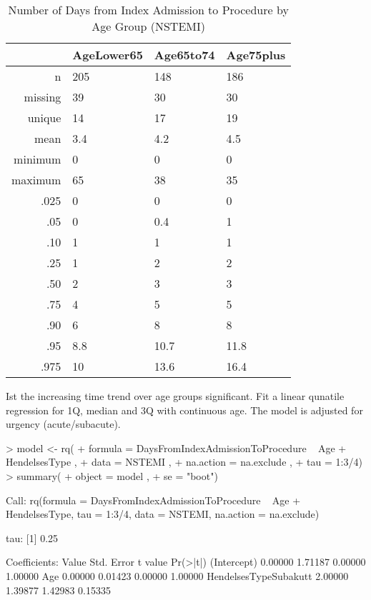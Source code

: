 \documentclass[a4paper]{report}
\begin{document}
\begin{itemize}
{%
\begin{table}[ht]
\centering
\begin{tabular}{rlll}
  \toprule
 & AgeLower65 & Age65to74 & Age75plus \\ 
  \midrule
n & 205 & 148 & 186 \\ 
  missing & 39 & 30 & 30 \\ 
  unique & 14 & 17 & 19 \\ 
  mean & 3.4 & 4.2 & 4.5 \\ 
  minimum & 0 & 0 & 0 \\ 
  maximum & 65 & 38 & 35 \\ 
  .025 & 0 & 0 & 0 \\ 
  .05 & 0 & 0.4 & 1 \\ 
  .10 & 1 & 1 & 1 \\ 
  .25 & 1 & 2 & 2 \\ 
  .50 & 2 & 3 & 3 \\ 
  .75 & 4 & 5 & 5 \\ 
  .90 & 6 & 8 & 8 \\ 
  .95 & 8.8 & 10.7 & 11.8 \\ 
  .975 & 10 & 13.6 & 16.4 \\ 
   \bottomrule
\end{tabular}
\caption{Number of Days from Index Admission to Procedure by Age Group (NSTEMI)} 
\end{table}
Ist the increasing time trend over age groups significant. Fit a linear qunatile regression for 1Q, median and 3Q with continuous age. The model is adjusted for urgency (acute/subacute).
\begin{Schunk}
\begin{Sinput}
> model <- rq(
+     formula = DaysFromIndexAdmissionToProcedure ~ Age + HendelsesType ,
+     data = NSTEMI ,
+     na.action = na.exclude ,
+     tau = 1:3/4)
> summary(
+     object = model ,
+     se = "boot")
\end{Sinput}
\begin{Soutput}
Call: rq(formula = DaysFromIndexAdmissionToProcedure ~ Age + HendelsesType, 
    tau = 1:3/4, data = NSTEMI, na.action = na.exclude)

tau: [1] 0.25

Coefficients:
                      Value   Std. Error t value Pr(>|t|)
(Intercept)           0.00000 1.71187    0.00000 1.00000 
Age                   0.00000 0.01423    0.00000 1.00000 
HendelsesTypeSubakutt 2.00000 1.39877    1.42983 0.15335 


\end{Soutput}
\end{Schunk}}
\end{itemize}
\end{document}
